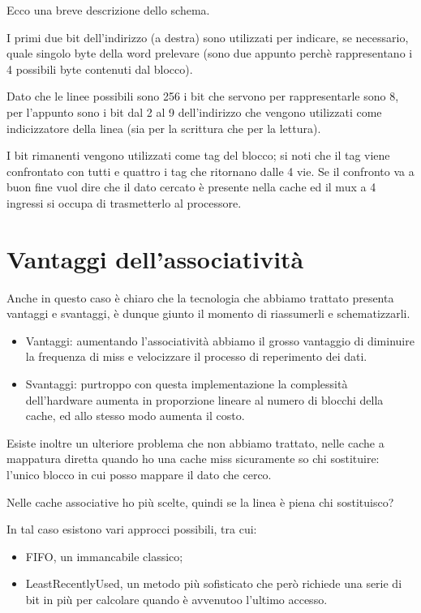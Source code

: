 \documentclass[class=book, crop=false, oneside]{standalone}
\begin{document}
Ecco una breve descrizione dello schema.

I primi due bit dell'indirizzo (a destra) sono utilizzati per indicare, se necessario, quale singolo byte della word prelevare (sono due appunto perchè rappresentano i 4 possibili byte contenuti dal blocco).

Dato che le linee possibili sono 256 i bit che servono per rappresentarle sono 8, per l'appunto sono i bit dal 2 al 9 dell'indirizzo che vengono utilizzati come indicizzatore della linea (sia per la scrittura che per la lettura).

I bit rimanenti vengono utilizzati come tag del blocco; si noti che il tag viene confrontato con tutti e quattro i tag che ritornano dalle 4 vie.
Se il confronto va a buon fine vuol dire che il dato cercato è presente nella cache ed il mux a 4 ingressi si occupa di trasmetterlo al processore.

\section{Vantaggi dell'associatività}
Anche in questo caso è chiaro che la tecnologia che abbiamo trattato presenta vantaggi e svantaggi, è dunque giunto il momento di riassumerli e schematizzarli.
\begin{itemize}
	\item Vantaggi: aumentando l’associatività abbiamo il grosso vantaggio di diminuire la frequenza di miss e velocizzare il processo di reperimento dei dati.
	\item Svantaggi: purtroppo con questa implementazione la complessità dell'hardware aumenta in proporzione lineare al numero di blocchi della cache, ed allo stesso modo aumenta il costo.
\end{itemize}

Esiste inoltre un ulteriore problema che non abbiamo trattato, nelle cache a mappatura diretta quando ho una cache miss sicuramente so chi sostituire: l’unico blocco in cui posso mappare il dato che cerco.

Nelle cache associative ho più scelte, quindi se la linea è piena chi sostituisco?

In tal caso esistono vari approcci possibili, tra cui:
\begin{itemize}
	\item FIFO, un immancabile classico;
	\item LeastRecentlyUsed, un metodo più sofisticato che però richiede una serie di bit in più per calcolare quando è avvenutoo l'ultimo accesso.
\end{itemize}
\end{document}
